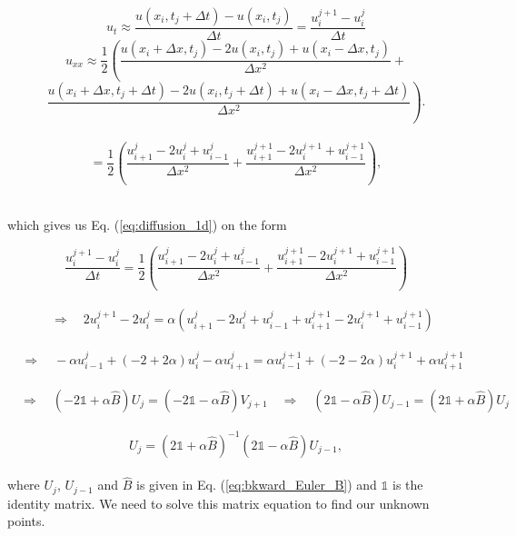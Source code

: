 \documentclass[12pt]{article}
\begin{document}
\begin{flushleft}
\vspace{5mm}
\begin{equation}\label{eq:Cranc_Nicolson_time}
u_t\approx \frac{u(x_i,t_j+\Delta t)-u(x_i,t_j)}{\Delta t} = \frac{u_i^{j+1}-u_i^j}{\Delta t} 
\end{equation}
\vspace{5mm}
\begin{equation}\label{eq:Cranc_Nicolson_space}
u_{xx}\approx \frac{1}{2}\left(\frac{u(x_i+\Delta x,t_j)-2u(x_i,t_j)+u(x_i-\Delta x,t_j)}{\Delta x^2}+\right.
\end{equation}
\vspace{5mm}
$$\left. \frac{u(x_i+\Delta x,t_j+\Delta t)-2u(x_i,t_j+\Delta t)+u(x_i-\Delta x,t_j+\Delta t)}{\Delta x^2}
\right).$$\\
\vspace{5mm}
$$ = \frac{1}{2}\left(\frac{u_{i+1}^j - 2u_i^j + u_{i-1}^j}{\Delta x^2} + \frac{u_{i+1}^{j+1} - 2u_i^{j+1} + u_{i-1}^{j+1}}{\Delta x^2}\right),$$\\
\vspace{5mm}

which gives us Eq. (\ref{eq:diffusion_1d}) on the form

\vspace{5mm}
$$\frac{u_i^{j+1}-u_i^j}{\Delta t}  = \frac{1}{2}\left(\frac{u_{i+1}^j - 2u_i^j + u_{i-1}^j}{\Delta x^2} + \frac{u_{i+1}^{j+1} - 2u_i^{j+1} + u_{i-1}^{j+1}}{\Delta x^2}\right)$$\\
\vspace{5mm}
$$\quad\Rightarrow\quad 2u_i^{j+1} - 2u_i^{j} = \alpha\left(u_{i+1}^j - 2u_i^j + u_{i-1}^j + u_{i+1}^{j+1} - 2u_i^{j+1} + u_{i-1}^{j+1}\right)$$\\
$$\quad\Rightarrow\quad -\alpha u_{i-1}^j + (-2 + 2\alpha)u_i^j - \alpha u_{i+1}^j = \alpha u_{i-1}^{j+1} + (-2 -2\alpha)u_i^{j+1} + \alpha u_{i+1}^{j+1}$$\\
$$ \quad\Rightarrow\quad (-2\mathbb{1} + \alpha\hat{B})U_j = (-2\mathbb{1} - \alpha\hat{B})V_{j+1} \quad\Rightarrow\quad (2\mathbb{1} - \alpha\hat{B})U_{j-1} = (2\mathbb{1} + \alpha\hat{B})U_j$$\\
\begin{equation}\label{eq:crank-nicolson_matrix}
U_j = (2\mathbb{1} + \alpha\hat{B})^{-1}(2\mathbb{1} - \alpha\hat{B})U_{j-1},
\end{equation}\\
\vspace{5mm}
where $U_j$, $U_{j-1}$ and $\hat{B}$ is given in Eq. (\ref{eq:bkward_Euler_B}) and $\mathbb{1}$ is the identity matrix. We need to solve this matrix equation to find our unknown points. 


\end{flushleft}
\end{document}
